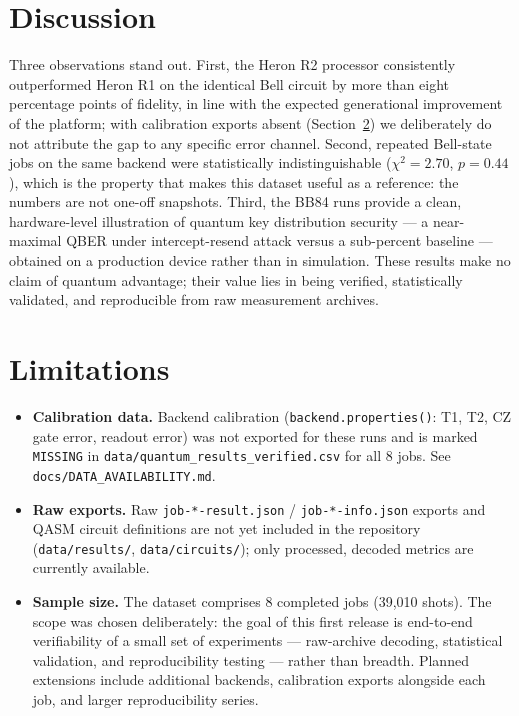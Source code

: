 \documentclass[11pt]{article}
\begin{document}
\section{Discussion}
Three observations stand out. First, the Heron R2 processor consistently
outperformed Heron R1 on the identical Bell circuit by more than eight
percentage points of fidelity, in line with the expected generational
improvement of the platform; with calibration exports absent
(Section~\ref{sec:limitations}) we deliberately do not attribute the gap to
any specific error channel. Second, repeated Bell-state jobs on the same
backend were statistically indistinguishable ($\chi^2=2.70$, $p=0.44$),
which is the property that makes this dataset useful as a reference: the
numbers are not one-off snapshots. Third, the BB84 runs provide a clean,
hardware-level illustration of quantum key distribution security --- a
near-maximal QBER under intercept-resend attack versus a sub-percent
baseline --- obtained on a production device rather than in simulation.
These results make no claim of quantum advantage; their value lies in being
verified, statistically validated, and reproducible from raw measurement
archives.

\section{Limitations}
\label{sec:limitations}
\begin{itemize}
  \item \textbf{Calibration data.} Backend calibration
    (\texttt{backend.properties()}: T1, T2, CZ gate error, readout
    error) was not exported for these runs and is marked
    \texttt{MISSING} in \texttt{data/quantum\_results\_verified.csv}
    for all 8 jobs. See \texttt{docs/DATA\_AVAILABILITY.md}.
  \item \textbf{Raw exports.} Raw \texttt{job-*-result.json} /
    \texttt{job-*-info.json} exports and QASM circuit definitions are
    not yet included in the repository (\texttt{data/results/},
    \texttt{data/circuits/}); only processed, decoded metrics are
    currently available.
  \item \textbf{Sample size.} The dataset comprises 8 completed jobs
    (39{,}010 shots). The scope was chosen deliberately: the goal of this
    first release is end-to-end verifiability of a small set of experiments
    --- raw-archive decoding, statistical validation, and reproducibility
    testing --- rather than breadth. Planned extensions include additional
    backends, calibration exports alongside each job, and larger
    reproducibility series.
\end{itemize}
\end{document}
